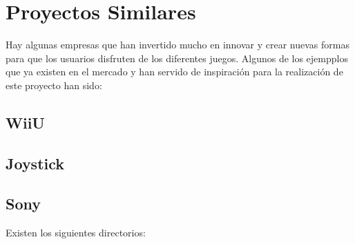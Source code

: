 \section{Proyectos Similares}

\label{cap2:sec:proyectos-similares}

Hay algunas empresas que han invertido mucho en innovar y crear nuevas formas para que los usuarios disfruten de los diferentes juegos. Algunos de los ejempplos que ya existen en el mercado y han servido de inspiraci\'on para la realizaci\'on de este proyecto han sido:

\subsection{WiiU}
\label{cap2:subsec:WiiU}
\subsection{Joystick}
\label{cap2:subsec:Joystick}
\subsection{Sony}
\label{cap2:subsec:Sony}


Existen los siguientes directorios:

